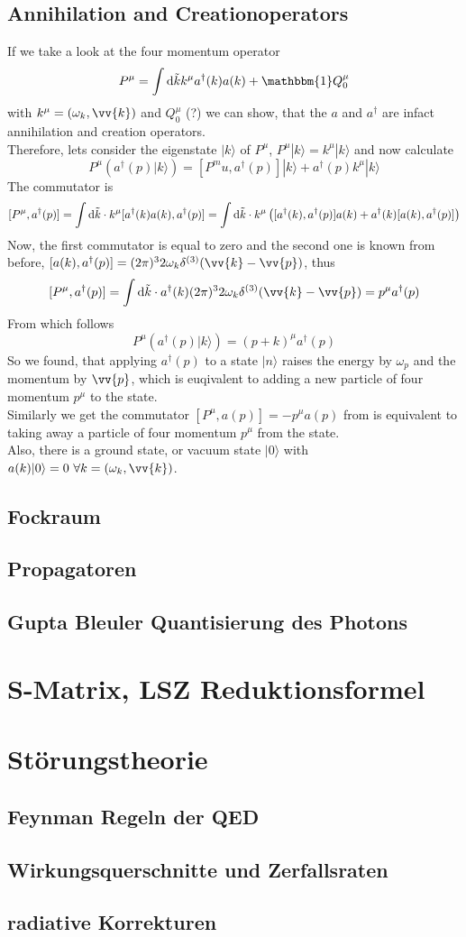 \documentclass{include/thesisclass}
\newcommand{\cc}{\cdot}
\newcommand{\rk}{\rangle}
\newcommand{\vp}{\vv{p}}
\newcommand{\dd}{{\rm d}}
\newcommand{\ehm}{\mathbbm{1}}
\begin{document}
\section{Annihilation and Creationoperators}
If we take a look at the four momentum operator
\[P^\mu = \int \dd \tilde{k} k^\mu a^\dagger(k) a(k) + \ehm Q_0^\mu\]
with $k^\mu = (\omega_k, \vv{k})$ and $Q_0^\mu$ (?) we can show, that the $a$ and $a^\dagger$ are infact annihilation and creation operators.\\
Therefore, lets consider the eigenstate $|k\rk$ of $P^\mu$, $P^\mu|k\rk = k^\mu|k\rk$ and now calculate
\[ P^\mu\left( a^\dagger(p) |k\rk\right) = [ P^mu, a^\dagger(p)]|k\rk + a^\dagger(p) k^\mu|k\rk\]
The commutator is
\[ [P^\mu, a^\dagger(p)] = \int \dd \tilde{k}\cc k^\mu [ a^\dagger(k)a(k), a^\dagger(p)] = \int \dd \tilde{k}\cc k^\mu \left([ a^\dagger(k), a^\dagger(p)]a(k) + a^\dagger(k) [a(k), a^\dagger(p)]\right)\]
Now, the first commutator is equal to zero and the second one is known from before, $[a(k), a^\dagger(p)] = (2\pi)^3 2 \omega_k \delta^{(3)} (\vv{k} - \vp)$, thus
\[ [P^\mu, a^\dagger(p)] = \int \dd \tilde{k}\cc a^\dagger(k)(2\pi)^3 2 \omega_k \delta^{(3)}(\vv{k}-\vp) = p^\mu a^\dagger(p)\]
From which follows
\[ P^\mu \left( a^\dagger(p) |k\rk\right) = ( p + k )^\mu a^\dagger(p)\]
So we found, that applying $a^\dagger(p)$ to a state $|n\rk$ raises the energy by $\omega_p$ and the momentum by $\vp$, which is euqivalent to adding a new particle of four momentum $p^\mu$ to the state.\\
Similarly we get the commutator $[P^\mu, a(p)] = - p^\mu a(p)$ from is equivalent to taking away a particle of four momentum $p^\mu$ from the state.\\
Also, there is a ground state, or vacuum state $|0\rk$ with $a(k) |0\rk = 0 ~\forall k = (\omega_k, \vv{k})$.


\section{Fockraum}
\section{Propagatoren}
\section{Gupta Bleuler Quantisierung des Photons}

\chapter{S-Matrix, LSZ Reduktionsformel}

\chapter{Störungstheorie}	
\section{Feynman Regeln der QED}
\section{Wirkungsquerschnitte und Zerfallsraten}
\section{radiative Korrekturen}
\end{document}
